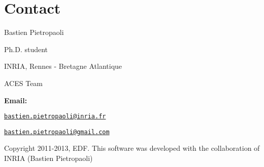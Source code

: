 \hypertarget{_tuto_page_Tuto_contact}{}\section{Contact}\label{_tuto_page_Tuto_contact}
Bastien Pietropaoli \par
 Ph.\-D. student \par
 I\-N\-R\-I\-A, Rennes -\/ Bretagne Atlantique \par
 A\-C\-E\-S Team \par


{\bfseries Email\-:} \par
 \href{mailto:bastien.pietropaoli@inria.fr}{\tt bastien.\-pietropaoli@inria.\-fr} \par
 \href{mailto:bastien.pietropaoli@gmail.com}{\tt bastien.\-pietropaoli@gmail.\-com} \par


Copyright 2011-\/2013, E\-D\-F. This software was developed with the collaboration of I\-N\-R\-I\-A (Bastien Pietropaoli) 